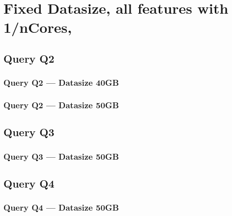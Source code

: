 \newpage
\section{Fixed Datasize, all features with 1/nCores,}
\subsection{Query Q2}
\subsubsection{Query Q2 --- Datasize 40GB}



\newpage
\subsubsection{Query Q2 --- Datasize 50GB}



\newpage


\subsection{Query Q3}
\subsubsection{Query Q3 --- Datasize 50GB}



\newpage

\subsection{Query Q4}
\subsubsection{Query Q4 --- Datasize 50GB}



\newpage

